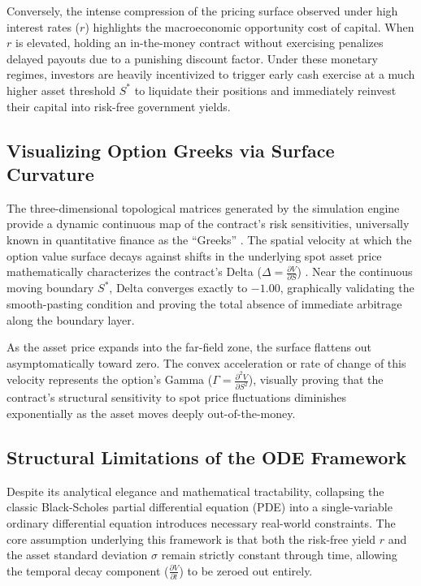 \documentclass[12pt]{article}
\theoremstyle{definition}
\numberwithin{equation}{section}
\begin{document}
Conversely, 
the intense compression of the pricing surface observed under high interest rates ($r$) highlights the macroeconomic opportunity cost of capital. 
When $r$ is elevated, 
holding an in-the-money contract without exercising penalizes delayed payouts due to a punishing discount factor. 
Under these monetary regimes, 
investors are heavily incentivized to trigger early cash exercise at a much higher asset threshold $S^*$ 
to liquidate their positions and immediately reinvest their capital into risk-free government yields.

\subsection{Visualizing Option Greeks via Surface Curvature}
The three-dimensional topological matrices generated by the simulation engine provide a dynamic continuous map of the contract's risk sensitivities, 
universally known in quantitative finance as the ``Greeks'' \cite{black1973pricing, hull2012options}. 
The spatial velocity at which the option value surface decays against shifts in the underlying spot 
asset price mathematically characterizes the contract's Delta ($\Delta = \frac{\partial V}{\partial S}$) \cite{hull2012options}. 
Near the continuous moving boundary $S^*$, Delta converges exactly to $-1.00$, graphically validating the smooth-pasting condition and proving the total absence of immediate arbitrage along the boundary layer. 

As the asset price expands into the far-field zone, 
the surface flattens out asymptomatically toward zero. 
The convex acceleration or rate of change of this velocity represents the option's Gamma ($\Gamma = \frac{\partial^2 V}{\partial S^2}$), 
visually proving that the contract's structural sensitivity to spot price fluctuations diminishes exponentially as the asset moves deeply out-of-the-money. 

\subsection{Structural Limitations of the ODE Framework}
Despite its analytical elegance and mathematical tractability, 
collapsing the classic Black-Scholes partial differential equation (PDE) 
into a single-variable ordinary differential equation introduces necessary real-world constraints. 
The core assumption underlying this framework is that both the risk-free yield $r$ and the asset standard deviation $\sigma$ remain strictly constant through time, 
allowing the temporal decay component ($\frac{\partial V}{\partial t}$) to be zeroed out entirely. 
\end{document}
